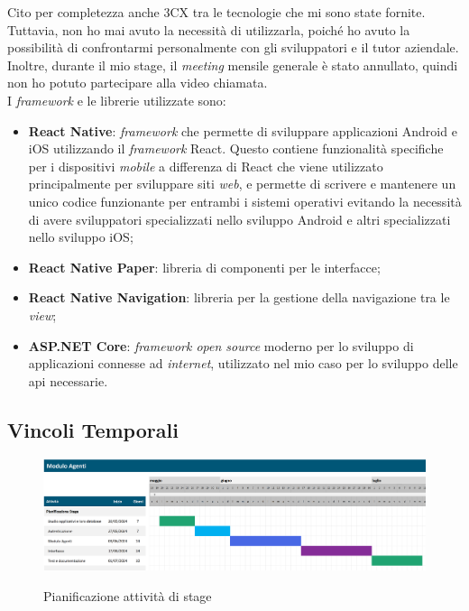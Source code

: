 Cito per completezza anche 3CX tra le tecnologie che mi sono state fornite. Tuttavia, non ho mai avuto la necessità di utilizzarla, 
poiché ho avuto la possibilità di confrontarmi personalmente con gli sviluppatori e il tutor aziendale. Inoltre, durante 
il mio stage, il 
\textit{meeting} mensile generale è stato annullato, quindi non ho potuto partecipare alla video chiamata.\\
I \textit{framework} e le librerie utilizzate sono:
\begin{itemize}
    \item \textbf{React Native}: \textit{framework} che permette di sviluppare applicazioni Android e iOS utilizzando il 
    \textit{framework} React. Questo contiene funzionalità specifiche per i dispositivi \textit{mobile} a differenza di 
    React che viene utilizzato principalmente per sviluppare siti \textit{web}, e permette di scrivere e mantenere un unico 
    codice funzionante per entrambi i sistemi operativi evitando la necessità di avere sviluppatori specializzati nello 
    sviluppo Android e altri specializzati nello sviluppo iOS;
    \item \textbf{React Native Paper}: libreria di componenti per le interfacce;
    \item \textbf{React Native Navigation}: libreria per la gestione della navigazione tra le \textit{view};
    \item \textbf{ASP.NET Core}: \textit{framework open source} moderno per lo sviluppo di applicazioni connesse ad \textit{internet}, 
          utilizzato nel mio caso per lo sviluppo delle \gls{api} necessarie.
\end{itemize}

\subsection{Vincoli Temporali}
\begin{figure}[H]
    \centering
    \includegraphics[alt={Pianificazione attività di stage}, width=\textwidth]{img/gantt pianificazione.png}
    \caption[Pianificazione attività di stage]
            {Pianificazione attività di stage}
    \label{fig:pianificazione stage}
\end{figure}

